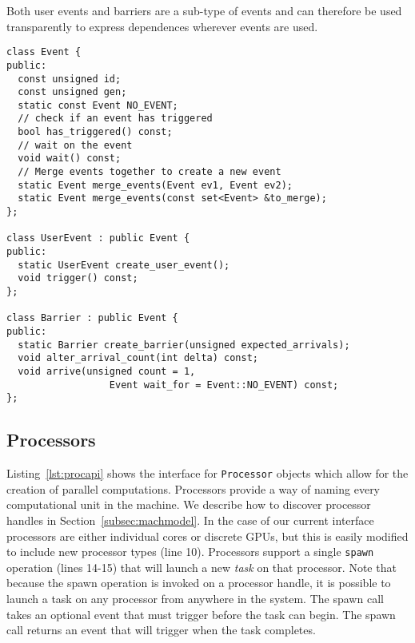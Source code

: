 Both user events and barriers are a sub-type of events and can therefore
be used transparently to express dependences wherever events are used.


\begin{lstlisting}[float={t},label={lst:eventapi},caption={Event Interface.}]
class Event {
public:
  const unsigned id;
  const unsigned gen;
  static const Event NO_EVENT;
  // check if an event has triggered
  bool has_triggered() const;
  // wait on the event
  void wait() const;
  // Merge events together to create a new event
  static Event merge_events(Event ev1, Event ev2);
  static Event merge_events(const set<Event> &to_merge);
};

class UserEvent : public Event {
public:
  static UserEvent create_user_event();
  void trigger() const;
};

class Barrier : public Event {
public:
  static Barrier create_barrier(unsigned expected_arrivals);
  void alter_arrival_count(int delta) const;
  void arrive(unsigned count = 1,
                  Event wait_for = Event::NO_EVENT) const;
};
\end{lstlisting}

\subsection{Processors}
\label{subsec:procs}
Listing~\ref{lst:procapi} shows the interface for {\tt Processor} objects which allow for
the creation of parallel computations.  Processors provide a way of naming 
every computational unit in the machine.  We describe how to discover processor handles
in Section~\ref{subsec:machmodel}.  In the case of our current interface 
processors are either individual cores or discrete GPUs, but this is easily modified 
to include new processor types (line 10).   Processors support a single {\tt spawn}
operation (lines 14-15) that will launch a new {\em task} on that processor.
Note that because the spawn operation
is invoked on a processor handle, it is possible to launch a task on any
processor from anywhere in the system.  
The spawn call takes an optional event that must trigger before the task can begin.  
The spawn call returns an event that will trigger when the task completes.

